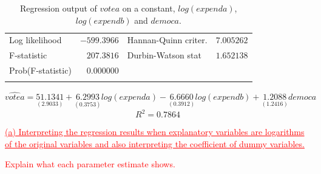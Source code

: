 \documentclass[12pt]{report}
\begin{document}
\begin{table}[H]
\begin{tabular}{lrrrr}
		\multicolumn{1}{l}{Log likelihood}&\multicolumn{1}{r}{$-599.3966$}&\multicolumn{2}{l}{Hannan-Quinn criter.}&\multicolumn{1}{r}{$7.005262$}\\
		\multicolumn{1}{l}{F-statistic}&\multicolumn{1}{r}{$207.3816$}&\multicolumn{2}{l}{Durbin-Watson stat}&\multicolumn{1}{r}{$1.652138$}\\
		\multicolumn{1}{l}{Prob(F-statistic)}&\multicolumn{1}{r}{$0.000000$}&\multicolumn{1}{c}{}&\multicolumn{1}{c}{}&\multicolumn{1}{c}{}\\
		[4.5pt] \hline \\ [-4.5pt]
	\end{tabular}
	\caption{Regression output of $votea$ on a constant, $log(expenda)$, $log(expendb)$ and $democa$.}
\end{table} \vspace{-\baselineskip}
\centering $\widehat{votea} = \underset{(2.9033)}{51.1341} + \underset{(0.3753)}{6.2993}log(expenda) - \underset{(0.3912)}{6.6660}log(expendb) + \underset{(1.2416)}{1.2088}democa$
$$R^2 = 0.7864$$

\newpage
\justify \noindent \textcolor{red}
{
	\uline{(a) Interpreting the regression results when explanatory variables are logarithms of the original variables and also interpreting the coefficient of dummy variables.}
}

\noindent \textcolor{red}
{
	Explain what each parameter estimate shows.
}
\end{document}
